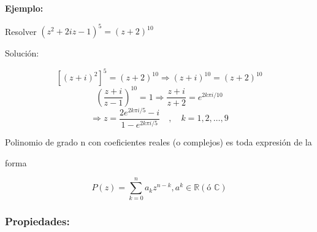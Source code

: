 \documentclass[a4paper,12pt]{article}
\begin{document}
\textbf{Ejemplo:}

Resolver \qquad $(z^2 + 2iz - 1)^5 = (z + 2)^{10}$

Solución:

\[
[(z + i)^2]^5 = (z + 2)^{10} \Rightarrow (z + i)^{10} = (z + 2)^{10}
\]
\[
\left(\frac{z+i}{z-1}\right)^{10} = 1 \Rightarrow \frac{z+i}{z+2} = e^{2k\pi i/10}
\]
\[
\Rightarrow z = \frac{2e^{2k\pi i/5} - i}{1 - e^{2k\pi i/5}} \quad , \quad k = 1,2, \ldots , 9
\]

Polinomio de grado n con coeficientes reales (o complejos) es toda expresión de la

forma 

\[
P(z) = \sum_{k=0}^n a_k z^{n-k} , a^k \in \mathbb{R} ( \text{ó }  \mathbb{C})
\]


\subsubsection{Propiedades:}
\end{document}
